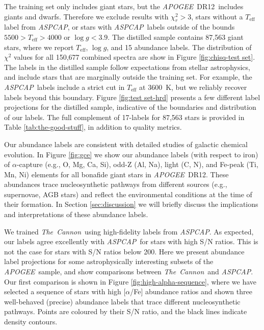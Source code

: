 \documentclass[12pt,preprint]{aastex6}
\newcommand{\project}[1]{\textsl{#1}}
\newcommand{\TheCannon}{\project{The~Cannon}}
\newcommand{\acronym}[1]{{\small{#1}}}
\newcommand{\apogee}{\project{\acronym{APOGEE}}}
\newcommand{\aspcap}{\project{\acronym{ASPCAP}}}
\newcommand{\dr}{\acronym{DR12}}
\newcommand{\logg}{\log g}
\newcommand{\Teff}{T_{\mathrm{eff}}}
\begin{document}
The training set only includes giant stars, but the \apogee\ \dr\ includes 
giants and dwarfs.  Therefore we exclude results with $\chi_r^2 > 3$, stars without a $\Teff$ label from \aspcap, or stars with \aspcap\ labels outside of the bounds $5500 > \Teff > 4000$ or $\logg < 3.9$.
The distilled sample contains 87,563 giant stars, where we report $\Teff$,
$\logg$, and 15 abundance labels.  The distribution of $\chi^2$ values for
all 150,677 combined spectra are show in Figure \ref{fig:chisq-test set}.  The
labels in the distilled sample follow expectations from stellar astrophysics,
and include stars that are marginally outside the training set.  For example,
the \aspcap\ labels include a strict cut in $\Teff$ at 3600~K, but we reliably
recover labels beyond this boundary.  Figure \ref{fig:test set-hrd} presents a
few different label projections for the distilled sample, indicative of the
boundaries and distribution of our labels.  The full complement of 17-labels
for 87,563 stars is provided in Table \ref{tab:the-good-stuff}, in addition
to quality metrics. 



Our abundance labels are consistent with detailed studies
of galactic chemical evolution.  In Figure \ref{fig:gce} we show our abundance
labels (with respect to iron) of $\alpha$-capture (e.g., O, Mg, Ca, Si), odd-Z
(Al, Na), light (C, N), and Fe-peak (Ti, Mn, Ni) elements for all bonafide
giant stars in \apogee\ \dr.  These abundances trace nucleosynthetic pathways
from different sources (e.g., supernovae, AGB stars) and reflect the environmental
conditions at the time of their formation.  In Section \ref{sec:discussion} 
we will briefly discuss the implications and interpretations of these abundance
labels.


We trained \TheCannon\ using high-fidelity labels from \aspcap.  As expected,
our labels agree excellently with \aspcap\ for stars with high S/N ratios.
This is not the case for stars with S/N ratios below 200.  Here we present
abundance label projections for some astrophysically interesting subsets of
the \apogee\ sample, and show comparisons between \TheCannon\ and \aspcap.
Our first comparison is shown in Figure \ref{fig:high-alpha-sequence}, where 
we have selected a sequence of stars with
high [$\alpha$/Fe] abundance ratios and shown three well-behaved (precise)
abundance labels that trace different nucleosynthetic pathways.  Points are
coloured by their S/N ratio, and the black lines indicate density contours.
\end{document}
